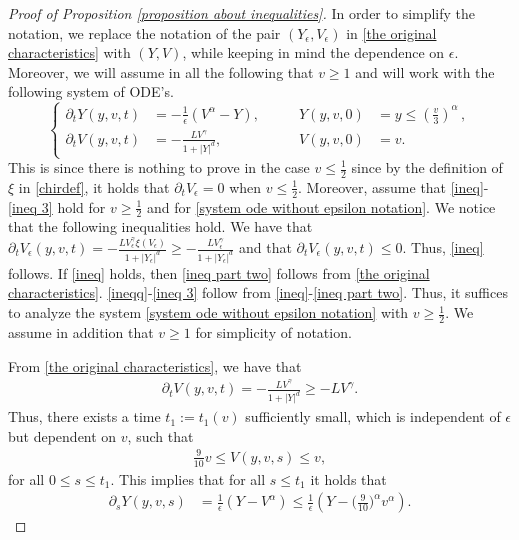 \documentclass[11pt]{article}
\numberwithin{equation}{section}
\begin{document}
  \begin{proof}[Proof of Proposition \ref{proposition about inequalities}]
In order to simplify the notation, we replace the notation of the pair $(Y_{\epsilon},V_{\epsilon})$ in \eqref{the original characteristics} with $(Y,V)$, while keeping in mind the dependence on $\epsilon$. Moreover, we will assume in all the following that $v\geq 1$ and will work with the following system of ODE's.
 \begin{equation}
\left\{\begin{aligned}\label{system ode without epsilon notation}
\partial_{t}{Y}(y,v,t)&=-\frac{1}{\epsilon}({V}^{\alpha}-Y), & \qquad {Y}(y,v,0)&=y\leq (\frac{v}{3})^{\alpha}\,, \\
\partial_{t}{V}(y,v,t)&=-\frac{{L}{V}^{\gamma}}{1+|{Y}|^{d}},& \qquad {V}(y,v,0)&=v.
   \end{aligned}\right.
   \end{equation} This is since there is nothing to prove in the case $v\leq \frac{1}{2}$ since by the definition of $\xi$ in \eqref{chirdef}, it holds that $\partial_{t}V_{\epsilon}=0$ when $v\leq \frac{1}{2}$. Moreover, assume that  \eqref{ineq}-\eqref{ineq 3} hold for $v\geq \frac{1}{2}$ and for \eqref{system ode without epsilon notation}. We notice that the following inequalities hold. We have that $\partial_{t}V_{\epsilon}(y,v,t)=-\frac{LV_{\epsilon}^{\gamma}\xi(V_{\epsilon})}{1+|Y_{\epsilon}|^{d}}\geq -\frac{LV_{\epsilon}^{\gamma}}{1+|Y_{\epsilon}|^{d}}$ and that $\partial_{t}V_{\epsilon}(y,v,t)\leq 0$. Thus, \eqref{ineq} follows. If \eqref{ineq} holds, then \eqref{ineq part two} follows from \eqref{the original characteristics}.  \eqref{ineqq}-\eqref{ineq 3} follow from \eqref{ineq}-\eqref{ineq part two}. Thus, it suffices to analyze the system \eqref{system ode without epsilon notation} with $v\geq \frac{1}{2}$. We assume in addition that $v\geq 1$ for simplicity of notation.
   
   
   From \eqref{the original characteristics}, we have that
   \begin{align}\label{lower bound der t v}
       \partial_{t}{V}(y,v,t)=-\frac{{L}{V}^{\gamma}}{1+|{Y}|^{d}}\geq-L V^{\gamma}.
   \end{align}Thus, there exists a time $t_{1}:=t_{1}(v)$ sufficiently small, which is independent of $\epsilon$ but dependent on $v$, such that
      \begin{align*}
      \frac{9}{10}v\leq V(y,v,s)\leq v,
      \end{align*}
      for all $0\leq s\leq t_{1}$. This implies that for all $s\leq t_{1}$ it holds that
  \begin{align}\label{iterative argument characteristics}
  \partial_{s}{Y}(y,v,s)&=\frac{1}{\epsilon}(Y-{V}^{\alpha})\leq \frac{1}{\epsilon}(Y-\Big(\frac{9}{10}\Big)^{\alpha}{v}^{\alpha}).
  \end{align}


\end{proof}
\end{document}
